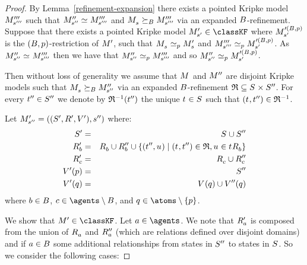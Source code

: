 \begin{proof}
By Lemma~\ref{refinement-expansion} there exists a pointed Kripke model $\kPModelPPP{\kStateSPPP}$ such that $\kPModelPP{\kStateSPP} \bisimilar \kPModelPPP{\kStateSPPP}$ and $\kPModel{\kStateS} \simulates[\agentsB] \kPModelPPP{\kStateSPPP}$ via an expanded $\agentsB$-refinement.
Suppose that there exists a pointed Kripke model $\kPModelP{\kStateSP} \in \classKF$ where $\kPModel[\prime(\agentsB, \atomP)]{\kStateSP}$ is the $(\agentsB, \atomP)$-restriction of $\kModelP$, such that $\kPModel{\kStateS} \bisimilar[\atomP] \kPModelP{\kStateS}$ and $\kPModelPPP{\kStateSPPP} \bisimilar[\atomP] \kPModel[\prime(\agentsB, \atomP)]{\kStateSP}$.
As $\kPModelPP{\kStateSPP} \bisimilar \kPModelPPP{\kStateSPPP}$ then we have that $\kPModelPP{\kStateSPP} \bisimilar[\atomP] \kPModelPPP{\kStateSPPP}$ and so $\kPModelPP{\kStateSPP} \bisimilar[\atomP] \kPModel[\prime(\agentsB, \atomP)]{\kStateSP}$.

Then without loss of generality we assume that $\kModel$ and $\kModelPP$ are disjoint Kripke models such that $\kPModel{\kStateS} \simulates[\agentsB] \kPModelPP{\kStateSPP}$ via an expanded $\agentsB$-refinement $\refinement \subseteq \kStates \times \kStatesPP$.
For every $\kStateTPP \in \kStatesPP$ we denote by $\refinement^{-1}(\kStateTPP)$ the unique $\kStateT \in \kStates$ such that $(\kStateT, \kStateTPP) \in \refinement^{-1}$.

Let $\kPModelAndTupleP{\kStateSPP}$ where:
\begin{eqnarray*}
    \kStatesP &=& \kStates \cup \kStatesPP\\
    \kAccessibilityPB &=& \kAccessibilityB \cup \kAccessibilityPPB \cup \{(\kStateTPP, \kStateU)  \mid (\kStateT, \kStateTPP) \in \refinement, \kStateU \in \kSuccessorsB{\kStateT}\}\\
    \kAccessibilityPC &=& \kAccessibilityC \cup \kAccessibilityPPC\\
    \kValuationP(\atomP) &=& \kStatesPP\\
    \kValuationP(\atomQ) &=& \kValuation(\atomQ) \cup \kValuationPP(\atomQ)
\end{eqnarray*}
where $\agentB \in \agentsB$, $\agentC \in \agents \setminus \agentsB$, and $\atomQ \in \atoms \setminus \{\atomP\}$.

We show that $\kModelP \in \classKF$.
Let $\agentA \in \agents$.
We note that $\kAccessibilityPA$ is composed from the union of $\kAccessibilityA$ and $\kAccessibilityPPA$ (which are relations defined over disjoint domains) and if $\agentA \in \agentsB$ some additional relationships from states in $\kStatesPP$ to states in $\kStates$.
So we consider the following cases:


\end{proof}
